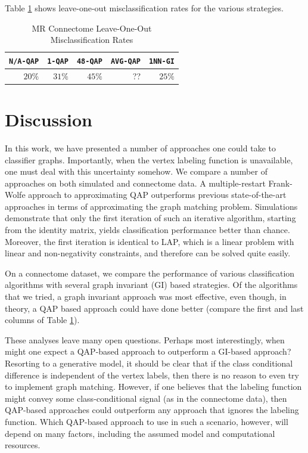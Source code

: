 \documentclass[10pt,journal,cspaper,compsoc]{IEEEtran}
\begin{document}
Table \ref{tab:connectome} shows leave-one-out misclassification rates for the various strategies.


\begin{table}[h!]
\caption{MR Connectome Leave-One-Out Misclassification Rates}
\begin{center}
\begin{tabular}{|r|r|r|r|r|}
\hline
\texttt{N/A-QAP} & \texttt{1-QAP} & \texttt{48-QAP} & \texttt{AVG-QAP} & \texttt{1NN-GI}\\
\hline
$20\%$ & $31\%$ & $45\%$ & ?? & $25\%$ \\
    \hline
\end{tabular}
\end{center}
\label{tab:connectome}
\end{table}%


\section{Discussion}


In this work, we have presented a number of approaches one could take to classifier graphs.  Importantly, when the vertex labeling function is unavailable, one must deal with this uncertainty somehow.  We compare a number of approaches on both simulated and connectome data.  A multiple-restart Frank-Wolfe approach to approximating QAP outperforms previous state-of-the-art approaches in terms of approximating the graph matching problem.  Simulations demonstrate that only the first iteration of such an iterative algorithm, starting from the identity matrix, yields classification performance better than chance.  Moreover, the first iteration is identical to LAP, which is a linear problem with linear and non-negativity constraints, and therefore can be solved quite easily.  

On a connectome dataset, we compare the performance of various \qap classification algorithms with several graph invariant (GI) based strategies.  Of the algorithms that we tried, a graph invariant approach was most effective, even though, in theory, a QAP based approach could have done better (compare the first and last columns of Table \ref{tab:connectome}).  

These analyses leave many open questions.  Perhaps most interestingly, when might one expect a QAP-based approach to outperform a GI-based approach?  Resorting to a generative model, it should be clear that if the class conditional difference is independent of the vertex labels, then there is no reason to even try to implement graph matching.  However, if one believes that the labeling function might convey some class-conditional signal (as in the connectome data), then QAP-based approaches could outperform any approach that ignores the labeling function.  Which QAP-based approach to use in such a scenario, however, will depend on many factors, including the assumed model and computational resources.
\end{document}
